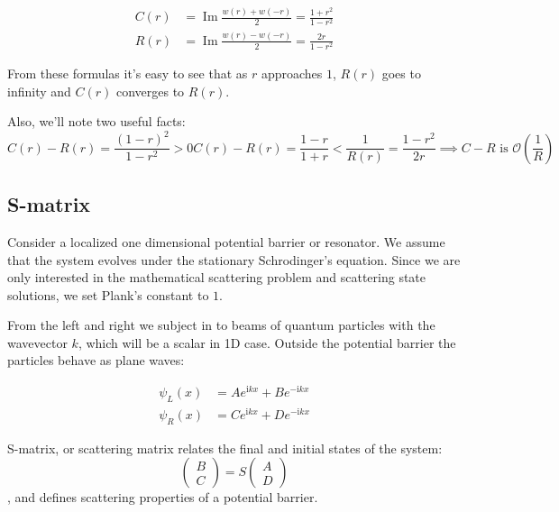 \documentclass{gCOV2e}
\theoremstyle{plain}%
\theoremstyle{definition}
\theoremstyle{remark}
\begin{document}
\begin{equation}\label{eq:c_and_r}
\begin{aligned}
   C(r) &= \operatorname{Im} \frac{w(r) + w(-r)}{2} = \frac{1 + r^2}{1 - r^2}
\\ R(r) &= \operatorname{Im} \frac{w(r) - w(-r)}{2} = \frac{2 r}{1 - r^2}
\end{aligned}
\end{equation}

From these formulas it's easy to see that as $r$ approaches $1$, $R(r)$ goes to infinity and $C(r)$ converges to $R(r)$.

Also, we'll note two useful facts:
\begin{subequations}
\begin{equation}
C(r) - R(r) = \frac{(1 - r)^2}{1 - r^2} > 0
\label{eq:cr_positive}
\end{equation}
\begin{equation}
C(r) - R(r) = \frac{1 - r}{1 + r} < \frac{1}{R(r)} = \frac{1 - r^2}{2 r} \implies C - R \text{\ is\ } \mathcal{O}\left(\frac{1}{R}\right)
\label{eq:cr_small}
\end{equation}
\end{subequations}

\subsection{S-matrix}\label{sec:smatrix}
Consider a localized one dimensional potential barrier or resonator. We assume that the system evolves under the stationary Schrodinger's equation. Since we are only interested in the mathematical scattering problem and scattering state solutions, we set Plank's constant to $1$.

From the left and right we subject in to beams of quantum particles with the wavevector $k$, which will be a scalar in 1D case. Outside the potential barrier the particles behave as plane waves:

\begin{equation}\label{eq:wlwl}
\begin{aligned}
   \psi_L(x) &= A e^{\mathrm{i} k x} + B e^{-\mathrm{i} k x}
\\ \psi_R(x) &= C e^{\mathrm{i} k x} + D e^{-\mathrm{i} k x}
\end{aligned}
\end{equation}

S-matrix, or scattering matrix relates the final and initial states of the system:
\begin{equation}\label{eq:smatrix}
\begin{pmatrix} B \\ C \end{pmatrix} = S \begin{pmatrix} A \\ D \end{pmatrix}
\end{equation}
, and defines scattering properties of a potential barrier.
\end{document}
